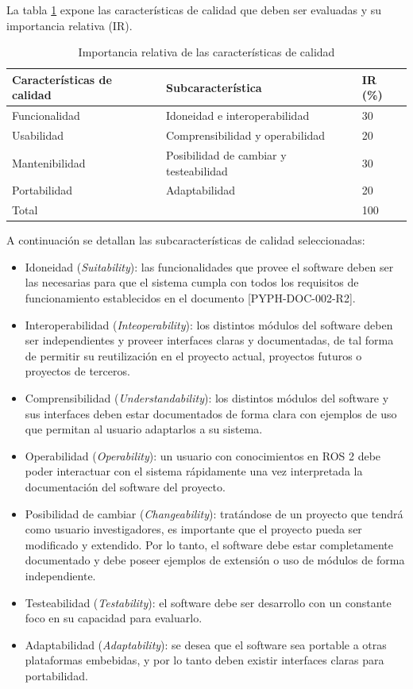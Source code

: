 \documentclass[
11pt, %
codirector, %
]{simple_charter}
\begin{document}
La tabla \ref{tab:qualty-char} expone las características de calidad que deben ser evaluadas
y su importancia relativa (IR).

\begin{table}[ht]
\centering
\begin{tabular}{@{}lll@{}}
\toprule
\textbf{Características de calidad} & \textbf{Subcaracterística} & \textbf{IR (\%)} \\ \midrule
Funcionalidad & Idoneidad e interoperabilidad & 30 \\
Usabilidad & Comprensibilidad y operabilidad & 20 \\
Mantenibilidad & Posibilidad de cambiar y testeabilidad & 30 \\
Portabilidad & Adaptabilidad & 20 \\
Total & & 100 \\ \bottomrule
\end{tabular}
\caption{Importancia relativa de las características de calidad}
\label{tab:qualty-char}
\end{table}

A continuación se detallan las subcaracterísticas de calidad seleccionadas:

\begin{itemize}
	\item Idoneidad (\textit{Suitability}): las funcionalidades que provee el software deben ser las
	necesarias para que el sistema cumpla con todos los requisitos de funcionamiento establecidos en
	el documento [PYPH-DOC-002-R2].
	\item Interoperabilidad (\textit{Inteoperability}): los distintos módulos del software deben ser
	independientes y proveer interfaces claras y documentadas, de tal forma de permitir su
	reutilización en el proyecto actual, proyectos futuros o proyectos de terceros.
	\item Comprensibilidad (\textit{Understandability}): los distintos módulos del software y sus
	interfaces deben estar documentados de forma clara con ejemplos de uso que permitan al usuario
	adaptarlos a su sistema.
	\item Operabilidad (\textit{Operability}): un usuario con conocimientos en ROS 2 debe poder
	interactuar con el sistema rápidamente una vez interpretada la documentación del software del
	proyecto.
	\item Posibilidad de cambiar (\textit{Changeability}): tratándose de un proyecto que tendrá como
	usuario investigadores, es importante que el proyecto pueda ser modificado y extendido. Por lo
	tanto, el software debe estar completamente documentado y debe poseer ejemplos de extensión o uso
	de módulos de forma independiente.
	\item Testeabilidad (\textit{Testability}): el software debe ser desarrollo con un constante foco
	en su capacidad para evaluarlo.
	\item Adaptabilidad (\textit{Adaptability}):  se desea que el software sea portable a otras
	plataformas embebidas, y por lo tanto deben existir interfaces claras para portabilidad.
\end{itemize}
\end{document}
